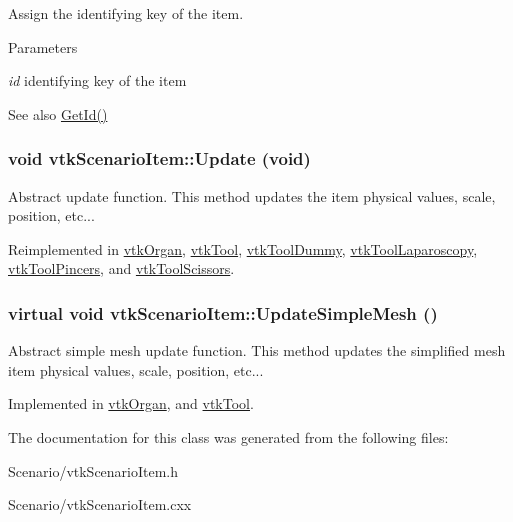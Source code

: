 Assign the identifying key of the item. 
\begin{DoxyParams}{Parameters}
\item[{\em id}]identifying key of the item \end{DoxyParams}
\begin{DoxySeeAlso}{See also}
\hyperlink{classvtkScenarioItem_a9884061bd42ee058291d95a67ddcac20}{GetId()} 
\end{DoxySeeAlso}
\hypertarget{classvtkScenarioItem_ad29b7f2958399100f919b4eb9627fbc1}{
\subsubsection[{Update}]{\setlength{\rightskip}{0pt plus 5cm}void vtkScenarioItem::Update (void)}}
\label{classvtkScenarioItem_ad29b7f2958399100f919b4eb9627fbc1}


Abstract update function. This method updates the item physical values, scale, position, etc... 

Reimplemented in \hyperlink{classvtkOrgan_a267da8ba8d4cfcef50b70dc5b9d19ae9}{vtkOrgan}, \hyperlink{classvtkTool_a0f1b6e049d7ff5420f4f4604434a9da7}{vtkTool}, \hyperlink{classvtkToolDummy_a19cda726ffda0a3955e519d7b42e4882}{vtkToolDummy}, \hyperlink{classvtkToolLaparoscopy_a4445a0cfabd77b50a06929b04cb71f9e}{vtkToolLaparoscopy}, \hyperlink{classvtkToolPincers_a57986aee2bcfa04472410cd7bf5c7929}{vtkToolPincers}, and \hyperlink{classvtkToolScissors_afe574b6b9e809f746308a157b6525c4b}{vtkToolScissors}.\hypertarget{classvtkScenarioItem_a75b837f36e8f79f51999dc1a7eecbe4b}{
\subsubsection[{UpdateSimpleMesh}]{\setlength{\rightskip}{0pt plus 5cm}virtual void vtkScenarioItem::UpdateSimpleMesh ()}}
\label{classvtkScenarioItem_a75b837f36e8f79f51999dc1a7eecbe4b}


Abstract simple mesh update function. This method updates the simplified mesh item physical values, scale, position, etc... 

Implemented in \hyperlink{classvtkOrgan_a943994fbb1b4f8a8e72f647f631cdd81}{vtkOrgan}, and \hyperlink{classvtkTool_ac44896d171f0512b821f7ab031f7fed7}{vtkTool}.

The documentation for this class was generated from the following files:\begin{DoxyCompactItemize}
\item 
Scenario/vtkScenarioItem.h\item 
Scenario/vtkScenarioItem.cxx\end{DoxyCompactItemize}

